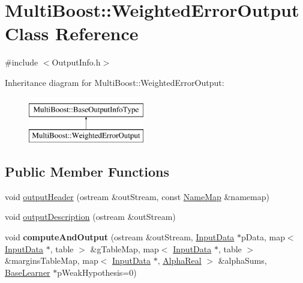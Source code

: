 \hypertarget{classMultiBoost_1_1WeightedErrorOutput}{\section{Multi\-Boost\-:\-:Weighted\-Error\-Output Class Reference}
\label{classMultiBoost_1_1WeightedErrorOutput}
}


{\ttfamily \#include $<$Output\-Info.\-h$>$}

Inheritance diagram for Multi\-Boost\-:\-:Weighted\-Error\-Output\-:\begin{figure}[H]
\begin{center}
\leavevmode
\includegraphics[height=2.000000cm]{classMultiBoost_1_1WeightedErrorOutput}
\end{center}
\end{figure}
\subsection*{Public Member Functions}
\begin{DoxyCompactItemize}
\item 
void \hyperlink{classMultiBoost_1_1WeightedErrorOutput_a389ffaa0bfa49309aca3d8fd9a0e819b}{output\-Header} (ostream \&out\-Stream, const \hyperlink{classMultiBoost_1_1NameMap}{Name\-Map} \&namemap)
\item 
void \hyperlink{classMultiBoost_1_1WeightedErrorOutput_ab01deac10cc19d323e6678563e0d863f}{output\-Description} (ostream \&out\-Stream)
\item 
\hypertarget{classMultiBoost_1_1WeightedErrorOutput_aa78f9ec8b307326888cc0d872d24b6f3}{void {\bfseries compute\-And\-Output} (ostream \&out\-Stream, \hyperlink{classMultiBoost_1_1InputData}{Input\-Data} $\ast$p\-Data, map$<$ \hyperlink{classMultiBoost_1_1InputData}{Input\-Data} $\ast$, table $>$ \&g\-Table\-Map, map$<$ \hyperlink{classMultiBoost_1_1InputData}{Input\-Data} $\ast$, table $>$ \&margins\-Table\-Map, map$<$ \hyperlink{classMultiBoost_1_1InputData}{Input\-Data} $\ast$, \hyperlink{Defaults_8h_a80184c4fd10ab70a1a17c5f97dcd1563}{Alpha\-Real} $>$ \&alpha\-Sums, \hyperlink{classMultiBoost_1_1BaseLearner}{Base\-Learner} $\ast$p\-Weak\-Hypothesis=0)}\label{classMultiBoost_1_1WeightedErrorOutput_aa78f9ec8b307326888cc0d872d24b6f3}

\end{DoxyCompactItemize}
